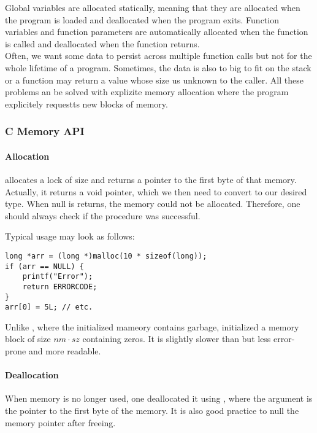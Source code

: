 

Global variables are allocated statically, meaning that they are allocated when the program is loaded and deallocated when the program exits. Function variables and function parameters are automatically allocated when the function is called and deallocated when the function returns.\\
Often, we want some data to persist across multiple function calls but not for the whole lifetime of a program. Sometimes, the data is also to big to fit on the stack or a function may return a value whose size us unknown to the caller. All these problems an be solved with explizite memory allocation where the program explicitely requestts new blocks of memory.\\ 
\subsubsection{C Memory API}
\paragraph{Allocation}
 allocates a lock of size  and returns a pointer to the first byte of that memory. Actually, it returns a void pointer, which we then need to convert to our desired type. When null is returns, the memory could not be allocated. Therefore, one should always check if the procedure was successful. 

Typical usage may look as follows:
\begin{lstlisting}
long *arr = (long *)malloc(10 * sizeof(long));
if (arr == NULL) {
    printf("Error");
    return ERRORCODE;
}
arr[0] = 5L; // etc.
\end{lstlisting}

Unlike , where the initialized mameory contains garbage,  initialized a memory block of size $nm \cdot sz$ containing zeros. It is slightly slower than  but less error-prone and more readable.

\paragraph{Deallocation}
When memory is no longer used, one deallocated it using , where the argument is the pointer to the first byte of the memory. It is also good practice to null the memory pointer after freeing.

